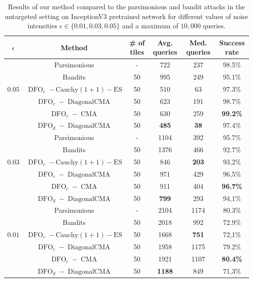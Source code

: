 \begin{table}[htb]
\caption{Results of our method compared to the parsimonious and bandit attacks in the untargeted setting on InceptionV3 pretrained network for different values of noise intensities $\epsilon\in\{0.01,0.03,0.05\}$ and a maximum of $10,000$ queries. } 
\label{untargeted_epsilon}
\begin{center}
\begin{tabular}{c|cc|cc|c}
\textbf{$\epsilon$} &\textbf{Method }&\textbf{ \# of tiles} &  \textbf{Avg. queries} & \textbf{Med. queries} & \textbf{Success rate} \\
 \hline
\multirow{5}{*}{$0.05$}&Parsimonious & - & 722 &237& 98.5\% \\
&Bandits & 50 & 995 & 249& 95.1\% \\
&$\operatorname{DFO}_c-\operatorname{Cauchy (1+1)-ES}$ &50&	510&	63	&97.3\% \\
&$\operatorname{DFO}_c-\operatorname{DiagonalCMA}$  &50&	623	&191&	98.7\%\\
&$\operatorname{DFO}_c-\operatorname{CMA}$  & 50&	630	&259&	\textbf{99.2\%}\\
&$\operatorname{DFO}_d-\operatorname{DiagonalCMA}$  & 50 & \textbf{485} & \textbf{38} & 97.4\%\\

\hline
\multirow{5}{*}{$0.03$}&Parsimonious & - & 1104 &392&  95.7\% \\

&Bandits & 50 & 1376& 466&92.7\%  \\

&$\operatorname{DFO}_c-\operatorname{Cauchy (1+1)-ES}$ & 50 & 846&	\textbf{203}	&93,2\% \\
&$\operatorname{DFO}_c-\operatorname{DiagonalCMA}$ & 50 & 971&	429&	96,5\%\\
&$\operatorname{DFO}_c-\operatorname{CMA}$ &50& 911&	404&	\textbf{96.7\%}\\

&$\operatorname{DFO}_d-\operatorname{DiagonalCMA}$  & 50 &\textbf{799}&	293&	94,1\% \\

\hline
\multirow{5}{*}{$0.01$}&Parsimonious & - & 2104 &1174& 80.3\% \\
&Bandits & 50 &2018&992& 72.9\% \\

&$\operatorname{DFO}_c-\operatorname{Cauchy (1+1)-ES}$& 50 & 1668&	\textbf{751}&	72,1\% \\
&$\operatorname{DFO}_c-\operatorname{DiagonalCMA}$ & 50 & 1958 &1175 & 79.2\%\\
&$\operatorname{DFO}_c-\operatorname{CMA}$& 50 & 1921 & 1107 & \textbf{80.4\%}\\
&$\operatorname{DFO}_d-\operatorname{DiagonalCMA}$ & 50 & \textbf{1188} &849&71,3\%\\

\hline

\end{tabular}
\end{center}
\end{table}


